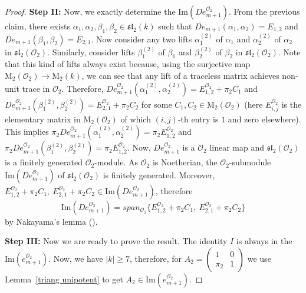 \documentclass[10pt,twoside]{amsart}
\newcommand{\M}{\mathrm{M}}
\newcommand{\im}{\mathrm{Im}}
\theoremstyle{definition}
\theoremstyle{definition}
\begin{document}
\begin{proof}
\textbf{Step II:} Now, we exactly determine the $\im(De_{m+1}^{\mathcal{O}_2})$. From the previous claim, there exists $\alpha_1, \alpha_2, \beta_1, \beta_2 \in \mathfrak{sl}_2(k)$ such that $\overline {De}_{m+1}(\alpha_1, \alpha_2) = E_{1,2}$ and $\overline{De}_{m+1}(\beta_1, \beta_2) = E_{2,1}$. Now consider any two lifts $\alpha_1^{(2)}$ of $\alpha_1$ and $\alpha_2^{(2)}$ of $\alpha_2$ in $\mathfrak{sl}_2(\mathcal{O}_2)$. Similarly, consider lifts $\beta_1^{(2)}$ of $\beta_1$ and $\beta_2^{(2)}$ of $\beta_2$ in $\mathfrak{sl}_2(\mathcal{O}_2)$. Note that this kind of lifts always exist because, using the surjective map $\M_2(\mathcal{O}_2) \rightarrow \M_2(k)$, we can see that any lift of a traceless matrix achieves non-unit trace in $\mathcal{O}_2$. Therefore, $De_{m+1}^{\mathcal{O}_2}(\alpha_1^{(2)}, \alpha_2^{(2)}) = E^{\mathcal{O}_2}_{1,2} + \pi_2C_1$ and $De_{m+1}^{\mathcal{O}_2}(\beta_1^{(2)}, \beta_2^{(2)}) = E^{\mathcal{O}_2}_{2,1} + \pi_2 C_2$ for some $C_1, C_2 \in \M_2(\mathcal{O}_2)$ (here $E^{\mathcal{O}_2}_{i,j}$ is the elementary matrix in $\M_2(\mathcal{O}_2)$ of which $(i,j)$-th entry is $1$ and zero elsewhere). This implies $\pi_2De_{m+1}^{\mathcal{O}_2}(\alpha_1^{(2)}, \alpha_2^{(2)}) = \pi_2E^{\mathcal{O}_2}_{1, 2}$ and $\pi_2 De_{m+1}^{\mathcal{O}_2}(\beta_1^{(2)}, \beta_2^{(2)}) = \pi_2 E^{\mathcal{O}_2}_{1,2}$. Now, $De_{m+1}^{\mathcal{O}_2}$ is a $\mathcal{O}_2$ linear map and $\mathfrak{sl}_2(\mathcal{O}_2)$ is a finitely generated $\mathcal{O}_2$-module. As $\mathcal{O}_2$ is Noetherian,  the $\mathcal{O}_2$-submodule $\im(De_{m+1}^{\mathcal{O}_2})$ of $\mathfrak{sl}_2(\mathcal{O}_2)$ is finitely generated. Moreover, $E^{\mathcal{O}_2}_{1,2} + \pi_2C_1,\  E^{\mathcal{O}_2}_{2,1} + \pi_2 C_2 \in \im(De_{m+1}^{\mathcal{O}_2})$, therefore $$\im(De_{m+1}^{\mathcal{O}_2}) = span_{\mathcal{O}_2}\{ E^{\mathcal{O}_2}_{1,2} + \pi_2C_1,\ E^{\mathcal{O}_2}_{2,1} + \pi_2C_2\}$$ 
by Nakayama's lemma (\cite[proposition 2.8]{Atiyahmacdonald}). 
    
\textbf{Step III:} Now we are ready to prove the result. The identity $I$ is always in the $\im(e_{m+1}^{\mathcal{O}_2})$. Now, we have $|k|\geq 7$,  therefore, for $A_2=\left(\begin{array}{cc} 1 & 0 \\ \pi_2 & 1 \end{array}\right)$ we use Lemma~\ref{triang unipotent} to get 
$A_2\in \im(e_{m+1}^{\mathcal{O}_2})$.


\end{proof}
\end{document}

